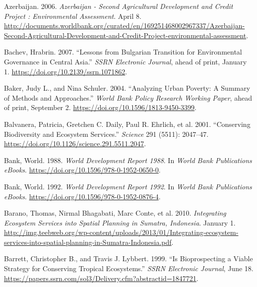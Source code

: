 \begin{CSLReferences}{1}{1}
Azerbaijan. 2006. \emph{Azerbaijan - Second Agricultural Development and
Credit Project : Environmental Assessment}. April 8.
\url{http://documents.worldbank.org/curated/en/169251468002967337/Azerbaijan-Second-Agricultural-Development-and-Credit-Project-environmental-assessment}.

Bachev, Hrabrin. 2007. {``Lessons from Bulgarian Transition for
Environmental Governance in Central Asia.''} \emph{SSRN Electronic
Journal}, ahead of print, January 1.
\url{https://doi.org/10.2139/ssrn.1071862}.

Baker, Judy L., and Nina Schuler. 2004. {``Analyzing Urban Poverty: A
Summary of Methods and Approaches.''} \emph{World Bank Policy Research
Working Paper}, ahead of print, September 2.
\url{https://doi.org/10.1596/1813-9450-3399}.

Balvanera, Patricia, Gretchen C. Daily, Paul R. Ehrlich, et al. 2001.
{``Conserving Biodiversity and Ecosystem Services.''} \emph{Science} 291
(5511): 2047--47. \url{https://doi.org/10.1126/science.291.5511.2047}.

Bank, World. 1988. \emph{World Development Report 1988}. In \emph{World
Bank Publications eBooks}.
\url{https://doi.org/10.1596/978-0-1952-0650-0}.

Bank, World. 1992. \emph{World Development Report 1992}. In \emph{World
Bank Publications eBooks}.
\url{https://doi.org/10.1596/978-0-1952-0876-4}.

Barano, Thomas, Nirmal Bhagabati, Marc Conte, et al. 2010.
\emph{Integrating Ecosystem Services into Spatial Planning in Sumatra,
Indonesia}. January 1.
\url{http://img.teebweb.org/wp-content/uploads/2013/01/Integrating-ecosystem-services-into-spatial-planning-in-Sumatra-Indonesia.pdf}.

Barrett, Christopher B., and Travis J. Lybbert. 1999. {``Is
Bioprospecting a Viable Strategy for Conserving Tropical Ecosystems.''}
\emph{SSRN Electronic Journal}, June 18.
\url{https://papers.ssrn.com/sol3/Delivery.cfm?abstractid=1847721}.


\end{CSLReferences}
